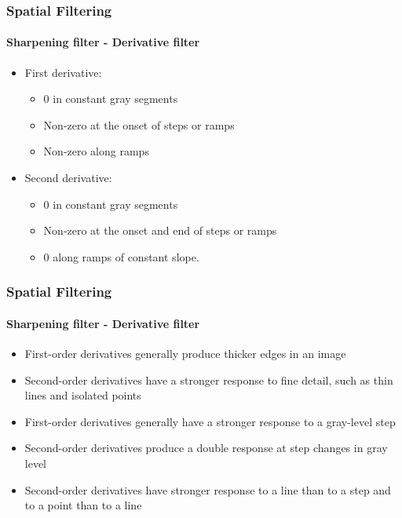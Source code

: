 \documentclass{beamer}
\begin{document}
\begin{frame}
\frametitle{Spatial Filtering}
\framesubtitle{Sharpening filter - Derivative filter}
\begin{itemize}
\item First derivative: 
	\begin{itemize}
	\item 0 in constant gray segments
	\item Non-zero at the onset of steps or ramps
	\item Non-zero along ramps
	\end{itemize}
\item Second derivative: 
	\begin{itemize}
	\item 0 in constant gray segments
	\item Non-zero at the onset and end of steps or ramps
	\item 0 along ramps of constant slope.
	\end{itemize}
\end{itemize}
\end{frame}
\begin{frame}
\frametitle{Spatial Filtering}
\framesubtitle{Sharpening filter - Derivative filter}
\begin{itemize}
\item First-order derivatives generally produce thicker edges in an image
\item Second-order derivatives have a stronger response to fine detail, such as thin lines and isolated points
\item First-order derivatives generally have a stronger response to a gray-level step
\item Second-order derivatives produce a double response at step changes in gray level
\item Second-order derivatives have stronger response to a line than to a step and to a point than to a line
\end{itemize}
\end{frame}
\end{document}
